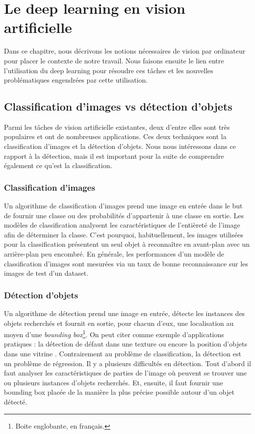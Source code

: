 \chapter{Le deep learning en vision artificielle}
\label{chap:related-works}
Dans ce chapitre, nous décrivons les notions nécessaires de vision par ordinateur pour placer le contexte de notre travail. Nous faisons ensuite le lien entre l'utilisation du deep learning pour résoudre ces tâches et les nouvelles problématiques engendrées par cette utilisation.

\section{Classification d'images vs détection d'objets}
\label{sec:class-vs-detect}
Parmi les tâches de vision artificielle existantes, deux d'entre elles sont très populaires et ont de nombreuses applications. Ces deux techniques sont la classification d'images et la détection d'objets. Nous nous intéressons dans ce rapport à la détection, mais il est important pour la suite de comprendre également ce qu'est la classification.

\subsection*{Classification d'images}
Un algorithme de classification d'images \cite{classification-survey} prend une image en entrée dans le but de fournir une classe ou des probabilités d'appartenir à une classe en sortie. Les modèles de classification analysent les caractéristiques de l'entièreté de l'image afin de déterminer la classe. C'est pourquoi, habituellement, les images utilisées pour la classification présentent un seul objet à reconnaître en avant-plan avec un arrière-plan peu encombré. En générale, les performances d'un modèle de classification d'images sont mesurées via un taux de bonne reconnaissance sur les images de test d'un dataset.

\subsection*{Détection d'objets}
Un algorithme de détection \cite{Object-detection-survey} prend une image en entrée, détecte les instances des objets recherchés et fournit en sortie, pour chacun d'eux, une localisation au moyen d'une \textit{bounding box}\footnote{Boite englobante, en français.}. On peut citer comme exemple d'applications pratiques : la détection de défaut dans une texture \cite{7966162} ou encore la position d'objets dans une vitrine \cite{Sun2019ExploringBF}. Contrairement au problème de classification, la détection est un problème de régression. Il y a plusieurs difficultés en détection. Tout d'abord il faut analyser les caractéristiques de parties de l'image où peuvent se trouver une ou plusieurs instances d'objets recherchés. Et, ensuite, il faut fournir une bounding box placée de la manière la plus précise possible autour d'un objet détecté.


